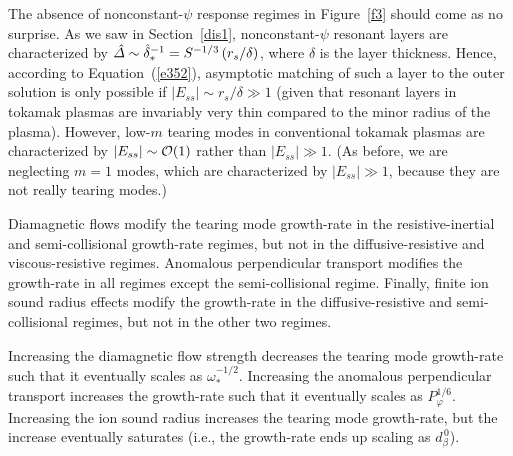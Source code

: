 \documentclass[notitlepage,12pt]{article}
\begin{document}
The absence of nonconstant-$\psi$ response regimes in Figure~\ref{f3}
should come as no surprise. As we saw in Section~\ref{dis1}, nonconstant-$\psi$ resonant layers
are characterized by $\hat{\mit\Delta}\sim\hat{\delta}_\ast^{-1}= S^{-1/3}\,(r_s/\delta)$, where $\delta$
is the layer thickness. Hence, according to Equation~(\ref{e352}), asymptotic matching of such a
layer to the outer solution is only possible if $|E_{ss}|\sim r_s/\delta \gg 1$ (given that resonant
layers in tokamak plasmas are invariably very thin compared to the minor radius of the plasma). However,
low-$m$ tearing modes in conventional tokamak plasmas are characterized by $|E_{ss}|\sim {\cal O}(1)$ rather than
$|E_{ss}|\gg 1$. (As before, we are neglecting $m=1$ modes, which are characterized by
$|E_{ss}|\gg 1$, because they are not really tearing modes.)

Diamagnetic flows modify the tearing mode growth-rate in the resistive-inertial and semi-collisional
growth-rate regimes, but not in the diffusive-resistive and viscous-resistive regimes. Anomalous perpendicular
transport modifies the growth-rate in all regimes except the semi-collisional regime. Finally, finite ion sound radius 
effects modify the growth-rate in the diffusive-resistive and semi-collisional regimes, but not in the other two
regimes. 

Increasing  the diamagnetic flow strength decreases the tearing mode growth-rate such that it
eventually scales as $\omega_\ast^{-1/2}$. Increasing the anomalous perpendicular transport increases the
growth-rate such that it  eventually scales as $P_\varphi^{1/6}$. Increasing the ion sound radius 
increases the tearing mode growth-rate, but the increase eventually saturates (i.e., the
growth-rate ends up scaling as $d_\beta^{\,0}$). 
\end{document}
